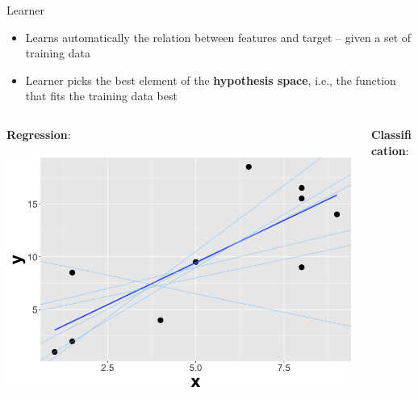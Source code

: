 \documentclass[11pt,compress,t,notes=noshow, xcolor=table]{beamer}
\begin{document}
\begin{vbframe}{Learner}

\begin{itemize}

\item Learns automatically the relation between features and target -- given a set of training data
\item Learner picks the best element of the \textbf{hypothesis space}, i.e., the function that fits the training data best
\end{itemize} \hspace{0.4cm}

\begin{columns}    
\begin{column}{0.4\textwidth} 
\textbf{Regression}: 

  \begin{center}
    \includegraphics[width=\textwidth]{slides/ml-basics/figure/nutshell-ml-basics-hypothesisspace-regr.png} 
  \end{center}
\end{column}    

\begin{column}{0.4\textwidth} 
\textbf{Classification}:
  

\end{column}
\end{columns}
\end{vbframe}
\end{document}
